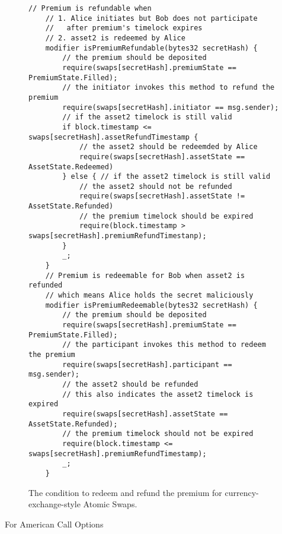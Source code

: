 \begin{figure}
    \begin{lstlisting}[language=Solidity, basicstyle=\tiny]
    // Premium is refundable when
    // 1. Alice initiates but Bob does not participate
    //   after premium's timelock expires
    // 2. asset2 is redeemed by Alice
    modifier isPremiumRefundable(bytes32 secretHash) {
        // the premium should be deposited
        require(swaps[secretHash].premiumState == PremiumState.Filled);
        // the initiator invokes this method to refund the premium
        require(swaps[secretHash].initiator == msg.sender);
        // if the asset2 timelock is still valid
        if block.timestamp <= swaps[secretHash].assetRefundTimestamp {
            // the asset2 should be redeemded by Alice
            require(swaps[secretHash].assetState == AssetState.Redeemed)
        } else { // if the asset2 timelock is still valid
            // the asset2 should not be refunded
            require(swaps[secretHash].assetState != AssetState.Refunded)
            // the premium timelock should be expired
            require(block.timestamp > swaps[secretHash].premiumRefundTimestanp);
        }
        _;
    }
    // Premium is redeemable for Bob when asset2 is refunded
    // which means Alice holds the secret maliciously
    modifier isPremiumRedeemable(bytes32 secretHash) {
        // the premium should be deposited
        require(swaps[secretHash].premiumState == PremiumState.Filled);
        // the participant invokes this method to redeem the premium
        require(swaps[secretHash].participant == msg.sender);
        // the asset2 should be refunded
        // this also indicates the asset2 timelock is expired
        require(swaps[secretHash].assetState == AssetState.Refunded);
        // the premium timelock should not be expired
        require(block.timestamp <= swaps[secretHash].premiumRefundTimestamp);
        _;
    }
    \end{lstlisting}
    \label{code:premium_condition_currency}
    \caption{The condition to redeem and refund the premium for currency-exchange-style Atomic Swaps.}
\end{figure}


For American Call Options

